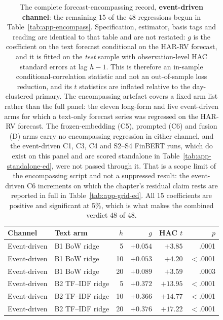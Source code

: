 \begin{table}[p]
\centering
\caption[The 48 encompassing regressions, event-driven half]{The complete
forecast-encompassing record, \textbf{event-driven channel}: the remaining
15 of the 48 regressions begun in
Table~\ref{tab:app-encompass}. Specification, estimator, basis tags and
reading are identical to that table and are not restated: $g$ is the
coefficient on the text forecast conditional on the HAR-RV forecast, and it
is fitted on the \emph{test} sample with observation-level HAC standard
errors at lag $h-1$. This is therefore an in-sample conditional-correlation
statistic and not an out-of-sample loss reduction, and its $t$ statistics
are inflated relative to the day-clustered primary. The encompassing
artefact covers a fixed arm list rather than the full panel: the eleven
long-form and five event-driven arms for which a text-only forecast series
was regressed on the HAR-RV forecast. The frozen-embedding (C5), prompted
(C6) and fusion (D) arms carry no encompassing regression in either
channel, and the event-driven C1, C3, C4 and S2--S4 FinBERT runs, which do
exist on this panel and are scored standalone in
Table~\ref{tab:app-standalone-ed}, were not passed through it. That is a
scope limit of the encompassing script and not a suppressed result: the
event-driven C6 increments on which the chapter's residual claim rests are
reported in full in Table~\ref{tab:app-grid-ed}. All 15
coefficients are positive and significant at 5\%, which is what makes the
combined verdict 48 of 48.}
\label{tab:app-encompass-ed}
\singlespacing\footnotesize
\setlength{\tabcolsep}{4pt}
\begin{tabular}{@{}llrrrr@{}}
\toprule
Channel & Text arm & $h$ & $g$ & HAC $t$ & $p$ \\
\midrule
Event-driven & B1 BoW ridge & 5 & $+0.054$ & $+3.85$ & .0001 \\
Event-driven & B1 BoW ridge & 10 & $+0.053$ & $+4.20$ & $<$.0001 \\
Event-driven & B1 BoW ridge & 20 & $+0.089$ & $+3.59$ & .0003 \\
\addlinespace
Event-driven & B2 TF--IDF ridge & 5 & $+0.372$ & $+13.95$ & $<$.0001 \\
Event-driven & B2 TF--IDF ridge & 10 & $+0.366$ & $+14.77$ & $<$.0001 \\
Event-driven & B2 TF--IDF ridge & 20 & $+0.376$ & $+17.22$ & $<$.0001 \\

\end{tabular}
\end{table}
